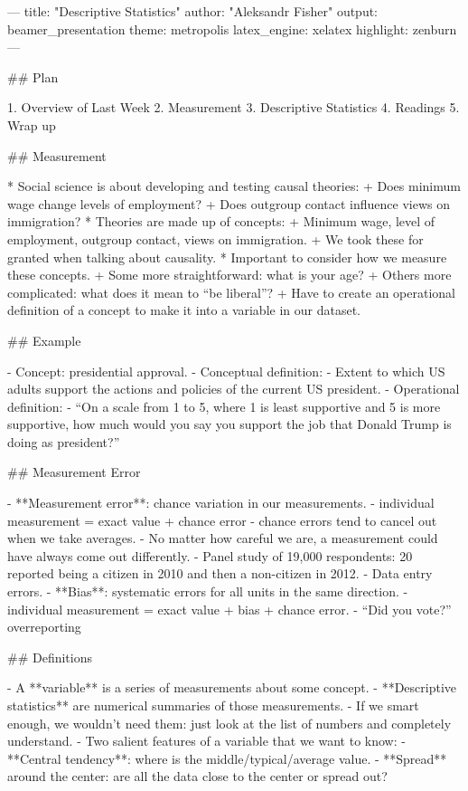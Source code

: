 ---
title: "Descriptive Statistics"
author: "Aleksandr Fisher"
output: beamer_presentation
theme: metropolis
latex_engine: xelatex
highlight: zenburn
---


## Plan

1. Overview of Last Week
2. Measurement 
3. Descriptive Statistics
4. Readings
5. Wrap up

## Measurement

* Social science is about developing and testing causal theories:
  + Does minimum wage change levels of employment?
  + Does outgroup contact influence views on immigration?
* Theories are made up of concepts:
  + Minimum wage, level of employment, outgroup contact, views on
immigration.
  + We took these for granted when talking about causality.
* Important to consider how we measure these concepts.
  + Some more straightforward: what is your age?
  + Others more complicated: what does it mean to “be liberal”?
  + Have to create an operational definition of a concept to make it into a
variable in our dataset.

## Example

- Concept: presidential approval.
- Conceptual definition:
  - Extent to which US adults support the actions and policies of the current US
president.
  - Operational definition:
- “On a scale from 1 to 5, where 1 is least supportive and 5 is more supportive,
how much would you say you support the job that Donald Trump is doing as
president?”

## Measurement Error

- **Measurement error**: chance variation in our measurements.
  - individual measurement = exact value + chance error
  - chance errors tend to cancel out when we take averages.
- No matter how careful we are, a measurement could have always come out
differently.
  - Panel study of 19,000 respondents: 20 reported being a citizen in 2010 and
then a non-citizen in 2012.
  - Data entry errors.
- **Bias**: systematic errors for all units in the same direction.
  - individual measurement = exact value + bias + chance error.
  - “Did you vote?” ~ overreporting

## Definitions

- A **variable** is a series of measurements about some concept.
- **Descriptive statistics** are numerical summaries of those measurements.
  - If we smart enough, we wouldn’t need them: just look at the list of numbers
and completely understand.
- Two salient features of a variable that we want to know:
  - **Central tendency**: where is the middle/typical/average value.
  - **Spread** around the center: are all the data close to the center or spread out?

